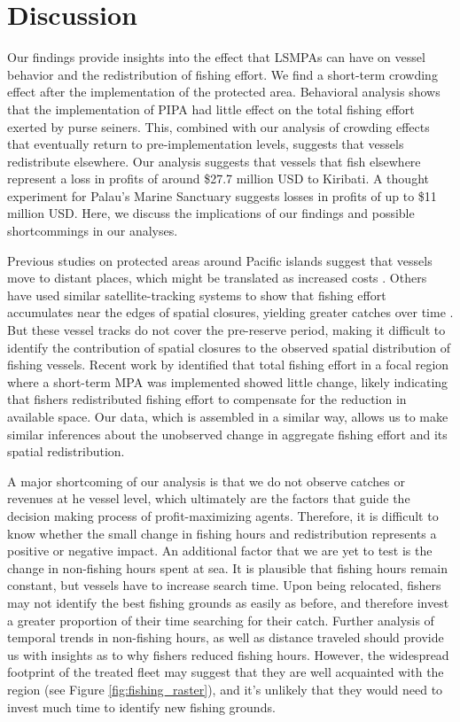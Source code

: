 \documentclass[9p,twocolumn,twoside,lineno]{pnas-new}
\begin{document}


\section{Discussion}

Our findings provide insights into the effect that LSMPAs can have on vessel behavior and the redistribution of fishing effort. We find a short-term crowding effect after the implementation of the protected area. Behavioral analysis shows that the implementation of PIPA had little effect on the total fishing effort exerted by purse seiners. This, combined with our analysis of crowding effects that eventually return to pre-implementation levels, suggests that vessels redistribute elsewhere. Our analysis suggests that vessels that fish elsewhere represent a loss in profits of around \$27.7 million USD to Kiribati. A thought experiment for Palau's Marine Sanctuary suggests losses in profits of up to \$11 million USD. Here, we discuss the implications of our findings and possible shortcommings in our analyses.

Previous studies on protected areas around Pacific islands suggest that vessels move to distant places, which might be translated as increased costs \citep{stevenson_2013}. Others have used similar satellite-tracking systems to show that fishing effort accumulates near the edges of spatial closures, yielding greater catches over time \citep{murawski_2005}. But these vessel tracks do not cover the pre-reserve period, making it difficult to identify the contribution of spatial closures to the observed spatial distribution of fishing vessels. Recent work by \cite{elahi_2018} identified that total fishing effort in a focal region where a short-term MPA was implemented showed little change, likely indicating that fishers redistributed fishing effort to compensate for the reduction in available space. Our data, which is assembled in a similar way, allows us to make similar inferences about the unobserved change in aggregate fishing effort and its spatial redistribution.

A major shortcoming of our analysis is that we do not observe catches or revenues at he vessel level, which ultimately are the factors that guide the decision making process of profit-maximizing agents. Therefore, it is difficult to know whether the small change in fishing hours and redistribution represents a positive or negative impact. An additional factor that we are yet to test is the change in non-fishing hours spent at sea. It is plausible that fishing hours remain constant, but vessels have to increase search time. Upon being relocated, fishers may not identify the best fishing grounds as easily as before, and therefore invest a greater proportion of their time searching for their catch. Further analysis of temporal trends in non-fishing hours, as well as distance traveled should provide us with insights as to why fishers reduced fishing hours. However, the widespread footprint of the treated fleet may suggest that they are well acquainted with the region (see Figure \ref{fig:fishing_raster}), and it's unlikely that they would need to invest much time to identify new fishing grounds.
\end{document}
